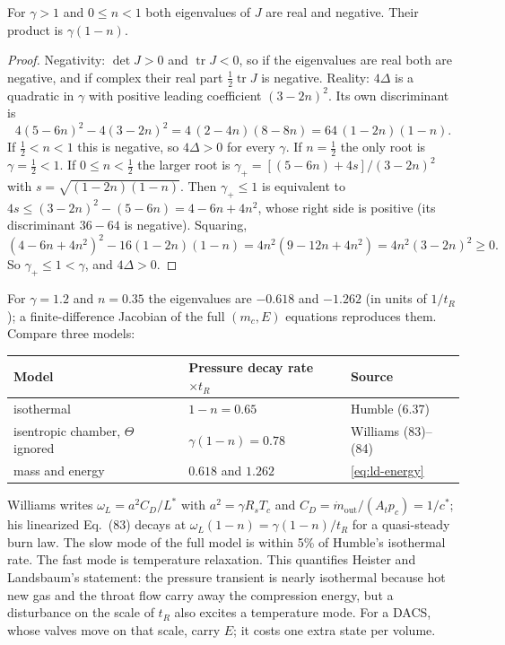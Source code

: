 \begin{proposition}\label{prop:ld-modes}
For $\gamma>1$ and $0\le n<1$ both eigenvalues of $J$ are real and
negative. Their product is $\gamma(1-n)$.
\end{proposition}
\begin{proof}
Negativity: $\det J>0$ and $\operatorname{tr}J<0$, so if the
eigenvalues are real both are negative, and if complex their real
part $\tfrac12\operatorname{tr}J$ is negative. Reality: $4\Delta$ is a
quadratic in $\gamma$ with positive leading coefficient $(3-2n)^2$. Its
own discriminant is
\[
 4(5-6n)^2-4(3-2n)^2=4\,(2-4n)(8-8n)=64\,(1-2n)(1-n).
\]
If $\tfrac12<n<1$ this is negative, so $4\Delta>0$ for every $\gamma$.
If $n=\tfrac12$ the only root is $\gamma=\tfrac12<1$. If
$0\le n<\tfrac12$ the larger root is
$\gamma_+=[(5-6n)+4s]/(3-2n)^2$ with $s=\sqrt{(1-2n)(1-n)}$. Then
$\gamma_+\le1$ is equivalent to $4s\le(3-2n)^2-(5-6n)=4-6n+4n^2$,
whose right side is positive (its discriminant $36-64$ is negative).
Squaring,
\[
 (4-6n+4n^2)^2-16(1-2n)(1-n)
 =4n^2(9-12n+4n^2)=4n^2(3-2n)^2\ge0 .
\]
So $\gamma_+\le1<\gamma$, and $4\Delta>0$.
\end{proof}
For $\gamma=1.2$ and $n=0.35$ the eigenvalues are $-0.618$ and $-1.262$
(in units of $1/t_R$); a finite-difference Jacobian of the full
$(m_c,E)$ equations reproduces them. Compare three models:
\begin{center}
\begin{tabular}{lll}
Model & Pressure decay rate $\times t_R$ & Source\\ \hline
isothermal & $1-n=0.65$ & Humble (6.37)\\
isentropic chamber, $\Theta$ ignored & $\gamma(1-n)=0.78$ &
  Williams (83)--(84)\\
mass and energy & $0.618$ and $1.262$ & \eqref{eq:ld-energy}
\end{tabular}
\end{center}
Williams writes $\omega_L=a^2C_D/L^*$ with $a^2=\gamma R_sT_c$ and
$C_D=\dot m_{\mathrm{out}}/(A_tp_c)=1/c^*$; his linearized Eq.~(83)
decays at $\omega_L(1-n)=\gamma(1-n)/t_R$ for a quasi-steady burn
law. The slow mode of the full model is within 5\% of Humble's
isothermal rate. The fast mode is temperature relaxation. This
quantifies Heister and Landsbaum's statement: the pressure transient
is nearly isothermal because hot new gas and the throat flow carry
away the compression energy, but a disturbance on the scale of
$t_R$ also excites a temperature mode. For a DACS, whose valves move
on that scale, carry $E$; it costs one extra state per volume.

